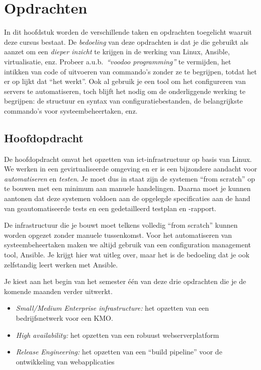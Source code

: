 \chapter{Opdrachten}
\label{ch:opdrachten}

In dit hoofdstuk worden de verschillende taken en opdrachten toegelicht waaruit deze cursus bestaat. De \emph{bedoeling} van deze opdrachten is dat je die gebruikt als aanzet om een \emph{dieper inzicht} te krijgen in de werking van Linux, Ansible, virtualisatie, enz. Probeer a.u.b.~\emph{``voodoo programming''} te vermijden, het intikken van code of uitvoeren van commando's zonder ze te begrijpen, totdat het er op lijkt dat ``het werkt''. Ook al gebruik je een tool om het configureren van servers te automatiseren, toch blijft het nodig om de onderliggende werking te begrijpen: de structuur en syntax van configuratiebestanden, de belangrijkste commando's voor systeembeheertaken, enz.

\section{Hoofdopdracht}
\label{sec:hoofdopdracht}

De hoofdopdracht omvat het opzetten van ict-infrastructuur op basis van Linux. We werken in een gevirtualiseerde omgeving en er is een bijzondere aandacht voor \emph{automatiseren} en \emph{testen}. Je moet dus in staat zijn de systemen ``from scratch'' op te bouwen met een minimum aan manuele handelingen. Daarna moet je kunnen aantonen dat deze systemen voldoen aan de opgelegde specificaties aan de hand van geautomatiseerde tests en een gedetailleerd testplan en -rapport.

De infrastructuur die je bouwt moet telkens volledig ``from scratch'' kunnen worden opgezet zonder manuele tussenkomst. Voor het automatiseren van systeembeheertaken maken we altijd gebruik van een configuration management tool, Ansible. Je krijgt hier wat uitleg over, maar het is de bedoeling dat je ook zelfstandig leert werken met Ansible.

Je kiest aan het begin van het semester één van deze drie opdrachten die je de komende maanden verder uitwerkt.

\begin{itemize}
\item \emph{Small/Medium Enterprise infrastructure:} het opzetten van een bedrijfsnetwerk voor een KMO.
\item \emph{High availability:} het opzetten van een robuust webserverplatform
\item \emph{Release Engineering:} het opzetten van een ``build pipeline'' voor de ontwikkeling van webapplicaties
\end{itemize}

